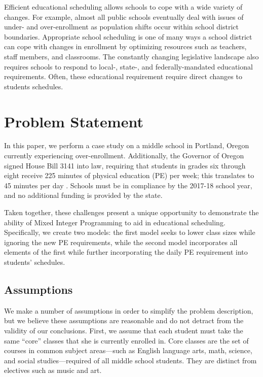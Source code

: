 \documentclass[12pt]{article}
\begin{document}
Efficient educational scheduling allows schools to cope with a wide variety of changes. For example, almost all public schools eventually deal with issues of under- and over-enrollment as population shifts occur within school district boundaries. Appropriate school scheduling is one of many ways a school district can cope with changes in enrollment by optimizing resources such as teachers, staff members, and classrooms.
The constantly changing legislative landscape also requires schools to respond to local-, state-, and federally-mandated educational requirements. Often, these educational requirement require direct changes to students schedules.

\section{Problem Statement}

In this paper, we perform a case study on a middle school in Portland, Oregon currently experiencing over-enrollment. Additionally, the Governor of Oregon signed House Bill 3141 into law, requiring that students in grades six through eight receive 225 minutes of physical education (PE) per week; this translates to 45 minutes per day \cite{HouseBill3141}. Schools must be in compliance by the 2017-18 school year, and no additional funding is provided by the state.

Taken together, these challenges present a unique opportunity to demonstrate the ability of Mixed Integer Programming to aid in educational scheduling. Specifically, we create two models: the first model seeks to lower class sizes while ignoring the new PE requirements, while the second model incorporates all elements of the first while further incorporating the daily PE requirement into students' schedules.

\subsection{Assumptions}

We make a number of assumptions in order to simplify the problem description, but we believe these assumptions are reasonable and do not detract from the validity of our conclusions. First, we assume that each student must take the same ``core'' classes that she is currently enrolled in. Core classes are the set of courses in common subject areas---such as English language arts, math, science, and social studies---required of all middle school students. They are distinct from electives such as music and art.
\end{document}
